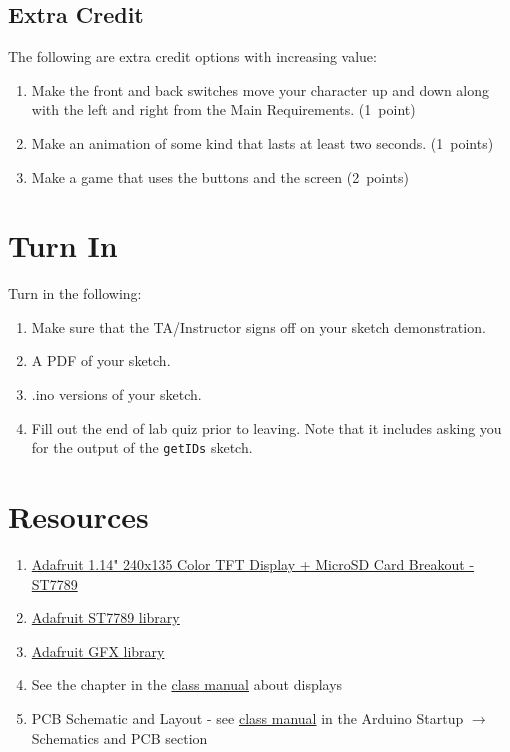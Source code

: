 \subsection{Extra Credit}
The following are extra credit options with increasing value:
\begin{enumerate}
    \item Make the front and back switches move your character up and down along 
            with the left and right from the Main Requirements. (1~point)
    \item Make an animation of some kind that lasts at least two seconds. (1~points)
    \item Make a game that uses the buttons and the screen (2~points)
\end{enumerate}

\section{Turn In}
Turn in the following:
\begin{enumerate}
    \item Make sure that the TA/Instructor signs off on your sketch demonstration.
    \item A PDF of your sketch.
    \item .ino versions of your sketch.
    \item Fill out the end of lab quiz prior to leaving. Note that it includes asking you 
            for the output of the \lstinline$getIDs$ sketch. 
\end{enumerate}

\section{Resources}\label{sec:displaysresources}
\begin{enumerate}
    \item \href{https://www.adafruit.com/product/4383}{Adafruit 1.14" 240x135 Color TFT Display + MicroSD Card Breakout - ST7789}
    \item \href{https://www.arduino.cc/reference/en/libraries/adafruit-st7735-and-st7789-library/}{Adafruit ST7789 library}
    \item \href{https://learn.adafruit.com/adafruit-gfx-graphics-library}{Adafruit GFX library}
    \item See the chapter in the \href{https://github.com/semcneil/Fundamentals-of-Microcontrollers-Manual}{class manual} about displays
    \item PCB Schematic and Layout - see 
            \href{https://github.com/semcneil/Fundamentals-of-Microcontrollers-Manual}{class manual} 
            in the Arduino Startup $\rightarrow$ Schematics and PCB section
\end{enumerate}


